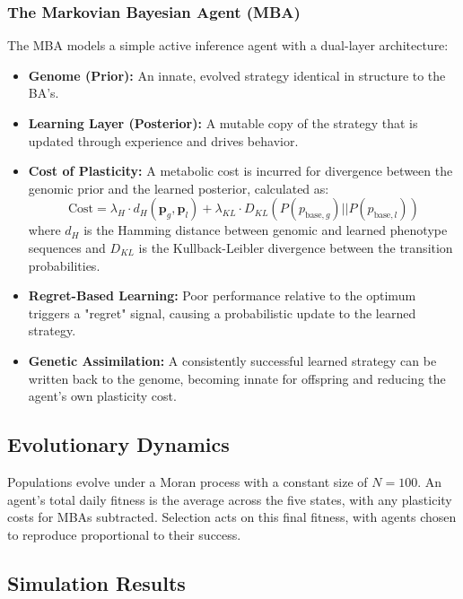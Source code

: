 \documentclass[aps,pre,twocolumn,floatfix,nofootinbib,amsmath,amssymb]{revtex4-2}
\begin{document}
\subsubsection{The Markovian Bayesian Agent (MBA)}
The MBA models a simple active inference agent with a dual-layer architecture:
\begin{itemize}
    \item \textbf{Genome (Prior):} An innate, evolved strategy identical in structure to the BA's.
    \item \textbf{Learning Layer (Posterior):} A mutable copy of the strategy that is updated through experience and drives behavior.
    \item \textbf{Cost of Plasticity:} A metabolic cost is incurred for divergence between the genomic prior and the learned posterior, calculated as:
    \begin{equation}
        \text{Cost} = \lambda_H \cdot d_H(\mathbf{p}_g, \mathbf{p}_l) + \lambda_{KL} \cdot D_{KL}(P(p_{\text{base},g}) || P(p_{\text{base},l}))
    \end{equation}
    where \(d_H\) is the Hamming distance between genomic and learned phenotype sequences and \(D_{KL}\) is the Kullback-Leibler divergence between the transition probabilities.
    \item \textbf{Regret-Based Learning:} Poor performance relative to the optimum triggers a "regret" signal, causing a probabilistic update to the learned strategy.
    \item \textbf{Genetic Assimilation:} A consistently successful learned strategy can be written back to the genome, becoming innate for offspring and reducing the agent's own plasticity cost.
\end{itemize}

\subsection{Evolutionary Dynamics}
Populations evolve under a Moran process with a constant size of \(N=100\). An agent's total daily fitness is the average across the five states, with any plasticity costs for MBAs subtracted. Selection acts on this final fitness, with agents chosen to reproduce proportional to their success.

\subsection{Simulation Results}
\end{document}
